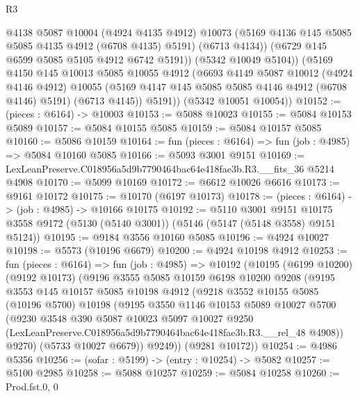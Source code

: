 \begin{lexlean}{R3}
\begin{coremodule}
              @4138
              @5087
              @10004
              (@4924 @4135 @4912)
              @10073
              (@5169 @4136 @145 @5085 @5085 @4135 @4912 (@6708 @4135) @5191)
              (@6713 @4134))
            (@6729 @145 @6599 @5085 @5105 @4912 @6742 @5191))
          (@5342 @10049 @5104))
        (@5169
          @4150
          @145
          @10013
          @5085
          @10055
          @4912
          (@6693
            @4149
            @5087
            @10012
            (@4924 @4146 @4912)
            @10055
            (@5169 @4147 @145 @5085 @5085 @4146 @4912 (@6708 @4146) @5191)
            (@6713 @4145))
          @5191))
      (@5342 @10051 @10054))
@10152 := (pieces : @6164) -> @10003
@10153 := @5088 @10023
@10155 := @5084 @10153 @5089
@10157 := @5084 @10155 @5085
@10159 := @5084 @10157 @5085
@10160 := @5086 @10159
@10164 := fun (pieces : @6164) => fun (job : @4985) => @5084 @10160 @5085
@10166 := @5093 @3001 @9151
@10169 := LexLeanPreserve.C018956a5d9b7790464bac64e418fae3b.R3.__fits_36 @5214 @4908
@10170 := @5099 @10169
@10172 := @6612 @10026 @6616
@10173 := @9161 @10172
@10175 := @10170 (@6197 @10173)
@10178 := (pieces : @6164) -> (job : @4985) -> @10166 @10175
@10192 := @5110
    @3001
    @9151
    @10175
    @3558
    @9172
    (@5130 (@5140 @3001))
    (@5146 (@5147 (@5148 @3558) @9151 @5124))
@10195 := @9184 @3556 @10160 @5085
@10196 := @4924 @10027
@10198 := @5573 (@10196 @6679)
@10200 := @4924 @10198 @4912
@10253 := fun (pieces : @6164) =>
  fun (job : @4985) =>
  @10192
    (@10195
      (@6199 @10200)
      (@9192 @10173)
      (@9196
        @3555
        @5085
        @10159
        @6198
        @10200
        @9208
        (@9195
          @3553
          @145
          @10157
          @5085
          @10198
          @4912
          (@9218
            @3552
            @10155
            @5085
            (@10196 @5700)
            @10198
            (@9195
              @3550
              @1146
              @10153
              @5089
              @10027
              @5700
              (@9230
                @3548
                @390
                @5087
                @10023
                @5097
                @10027
                @9250
                (LexLeanPreserve.C018956a5d9b7790464bac64e418fae3b.R3.__rel_48 @4908))
              @9270)
            (@5733 @10027 @6679))
          @9249))
      (@9281 @10172))
@10254 := @4986 @5356
@10256 := (sofar : @5199) -> (entry : @10254) -> @5082
@10257 := @5100 @2985
@10258 := @5088 @10257
@10259 := @5084 @10258
@10260 := Prod.fst.{0, 0}

\end{coremodule}
\end{lexlean}
